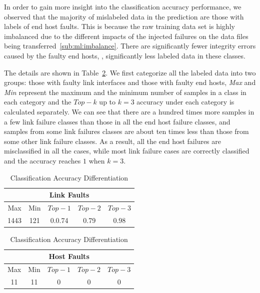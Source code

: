 In order to gain more insight into the classification accuracy performance, we observed that the majority of mislabeled data in the prediction are those with labels of end host faults.  This is because the raw training data set is highly imbalanced due to the different impacts of the injected failures on the data files being transferred~\ref{sub:ml:imbalance}. There are significantly fewer integrity errors caused by the faulty end hosts, \ie, significantly less labeled data in these classes.

The details are shown in Table~\ref{tab:class}. We first categorize all the labeled data into two groups: those with faulty link interfaces and those with faulty end hosts, {\it Max} and {\it Min} represent the maximum and the minimum number of samples in a class in each category and the $Top-k$ up to $k=3$ accuracy under each category is calculated separately. We can see that there are a hundred times more samples in a few link failure classes than those in all the end host failure classes, and samples from some link failures classes are about ten times less than those from some other link failure classes. As a result, all the end host failures are misclassified in all the cases, while most link failure cases are correctly classified and the accuracy reaches $1$ when $k=3$.

\begin{table}[!ht]
\caption{Classification Accuracy Differentiation}
\label{tab:class}
\begin{center}
\begin{tabular}{ |c|c|c|c|c| } 
 \hline
  \multicolumn{5}{|c|}{Link Faults} \\
 \hline
 Max & Min & $Top-1$ & $Top-2$ & $Top-3$\\ 
 \hline
 1443 & 121  & 0.0.74 &  0.79 & 0.98 \\
 \hline
\end{tabular}

\begin{tabular}{ |c|c|c|c|c|} 
 \hline
\multicolumn{5}{|c|}{Host Faults} \\
 \hline
 Max & Min & $Top-1$ & $Top-2$ & $Top-3$ \\ 
 \hline
11 & 11  & 0 &  0 & 0\\
  \hline
\end{tabular}
\end{center}
\end{table}

